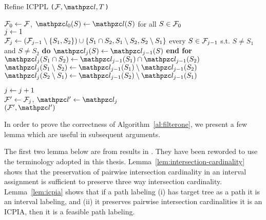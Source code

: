 \begin{algorithm}[h]
  \caption{Refine ICPPL {\tt \filteri($\cF, \cl, T$)}}
  \label{al:filterone} %
  \begin{algorithmic}[\lndisplay]
    \STATE ${\cal F}_0 \leftarrow {\cal F}$, $\cl_0(S) \assign \cl(S)$ for all $S \in {\cal F}_0$\\
    \STATE $j \leftarrow 1$\\
    \label{shareleaf} \STATE ${\cal F}_j \leftarrow ({\cal F}_{j-1} \setminus
    \{S_1, S_2\}) \cup \{S_1 \cap S_2, S_1 \setminus S_2, S_2
    \setminus S_1 \}$ \label{setbreak}   every $S \in
    {\cal F}_{j-1}$ s.t. $S \ne S_1$ and $S \ne
    S_2$ {\bf do} $\cl_j(S) \assign \cl_{j-1}(S)$ {\bf end for}\\

    \STATE $\cl_j(S_1 \cap S_2) \assign \cl_{j-1}(S_1) \cap
    \cl_{j-1}(S_2)$  \STATE $\cl_j(S_1
    \setminus S_2) \assign \cl_{j-1}(S_1) \setminus \cl_{j-1}(S_2)$
     \STATE $\cl_j(S_2
    \setminus S_1) \assign \cl_{j-1}(S_2) \setminus \cl_{j-1}(S_1)$


    \STATE $j \leftarrow j+1$\\
    \ENDWHILE
    \STATE ${\cal F}' \leftarrow {\cal F}_j$, $\cl' \assign \cl_j$\\
    \RETURN $(\cF', \cl')$
  \end{algorithmic}
\end{algorithm}

In order to prove the correctness of Algorithm~\ref{al:filterone}, we
present a few lemma which are useful in subsequent arguments.

The first two lemma below are from results in \cite{nsnrs09}.  They
have been reworded to use the terminology adopted in this
thesis. Lemma~\ref{lem:intersection-cardinality} shows that the
preservation of pairwise intersection cardinality in an interval
assignment is sufficient to preserve three way intersection
cardinality. Lemma~\ref{lem:icpia} shows that if a path labeling (i)
has target tree as a path \ie it is an interval labeling, and (ii) it
preserves pairwise intersection cardinalities \ie it is an ICPIA,
then it is a feasible path labeling.

